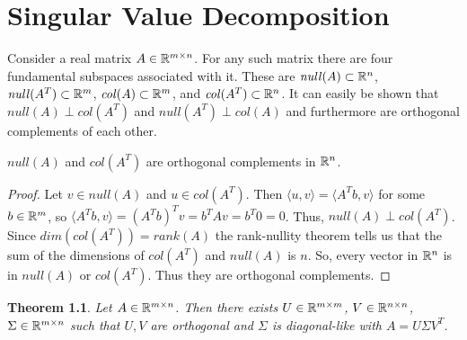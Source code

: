\chapter{Singular Value Decomposition}

\newtheorem{theorem}{Theorem}
\newtheorem{proposition}{Proposition}
\newtheorem{corollary}[theorem]{Corollary}
\newtheorem{definition}{Definition}
\newtheorem{definition/theorem}{Definition/Theorem}
\newtheorem{exercise}{Exercise}

Consider a real matrix $A \in \Bbb R^{m \times n}$. For any such matrix there are four fundamental subspaces associated with it. These are $\mathit{null}(A) \subset \Bbb R^n$, $\mathit{null}(A^T) \subset \Bbb R^m$, $\mathit{col}(A) \subset \Bbb R^m$, and $\mathit{col}(A^T) \subset \Bbb R^n$. It can easily be shown that $\mathit{null}(A) \perp \mathit{col}(A^T)$ and $\mathit{null}(A^T) \perp \mathit{col}(A)$ and furthermore are orthogonal complements of each other.

\begin{lemma}
$\mathit{null}(A)$ and $\mathit{col}(A^T)$ are orthogonal complements in $\Bbb R^n$.
\end{lemma}
\begin{proof}
Let $v \in \mathit{null}(A)$ and $u \in \mathit{col}(A^T)$. Then $\langle u, v \rangle = \langle A^Tb, v \rangle$ for some $b \in \Bbb R^m$, so $\langle A^Tb, v \rangle = (A^Tb)^Tv = b^T Av = b^T0 = 0$. Thus, $\mathit{null}(A) \perp \mathit{col}(A^T)$. Since $\mathit{dim} (\mathit{col}(A^T)) = \mathit{rank}(A)$ the rank-nullity theorem tells us that the sum of the dimensions of $\mathit{col}(A^T)$ and $\mathit{null}(A)$ is $n$. So, every vector in $\Bbb R^n$ is in $\mathit{null}(A)$ or $\mathit{col}(A^T)$. Thus they are orthogonal complements.
\end{proof}

\begin{theorem}

Let $A \in \Bbb R^{m \times n}$. Then there exists $U \in \Bbb R^{m \times m}$, $V \in \Bbb R^{n \times n}$, $\Sigma \in \Bbb R^{m \times n}$ such that $U, V$ are orthogonal and $\Sigma$ is diagonal-like with $A = U \Sigma V^{T}$.

\end{theorem}

